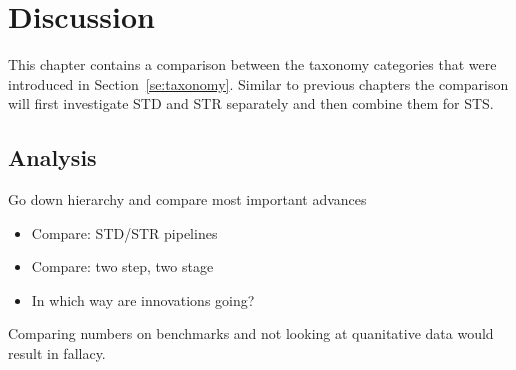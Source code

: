 \chapter{Discussion}\label{ch:discussion}
This chapter contains a comparison between the taxonomy categories that were introduced in
Section~\ref{se:taxonomy}.
Similar to previous chapters the comparison will first investigate \ac{STD} and \ac{STR} separately
and then combine them for \ac{STS}.


\section{Analysis}\label{se:analysis}
Go down hierarchy and compare most important advances
\begin{itemize}
    \item Compare: STD/STR pipelines
    \item Compare: two step, two stage
    \item In which way are innovations going?
\end{itemize}
Comparing numbers on benchmarks and not looking at quanitative data would result in fallacy.


